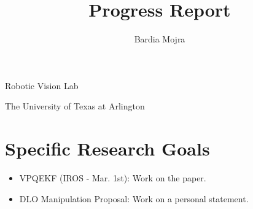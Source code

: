 \documentclass[11pt]{article}
\title{Progress Report}
\author{Bardia Mojra}
\begin{document}
\maketitle
\thispagestyle{empty}

\bigskip
\bigskip
\begin{center}
      Robotic Vision Lab
\end{center}

\begin{center}
      The University of Texas at Arlington
\end{center}

\newpage

\section{Specific Research Goals}
\begin{itemize}
      \item VPQEKF (IROS - Mar. 1st): Work on the paper.
      \item DLO Manipulation Proposal: Work on a personal statement.
\end{itemize}
\end{document}
